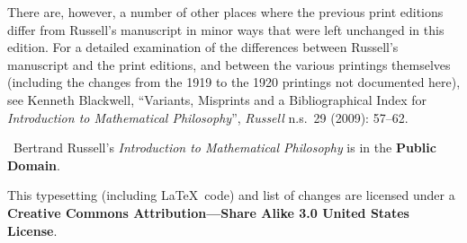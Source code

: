 \noindent There are, however, a number of other places where the previous print editions
differ from Russell's manuscript in minor ways 
that were left unchanged in this edition. For a detailed examination of the differences between Russell's 
manuscript and the print editions, and between the various printings themselves (including the changes from the 1919 to the 1920 printings not
documented here), see Kenneth Blackwell, ``Variants, Misprints and a Bibliographical Index for \textit{Introduction to Mathematical Philosophy}'', \textit{Russell} n.s.\ 29 (2009): 57--62.

\bigskip

\noindent {\Huge \copyright}\ Bertrand Russell's \textit{Introduction to Mathematical Philosophy} is in the \textbf{Public Domain}.

\noindent {}%
%
%
%
%

\bigskip

\noindent This typesetting (including \LaTeX\ code) and list of changes are licensed under a \textbf{Creative Commons Attribution---\iphoneonly{\linebreak}Share Alike 3.0 United States License}.

\noindent {}%

